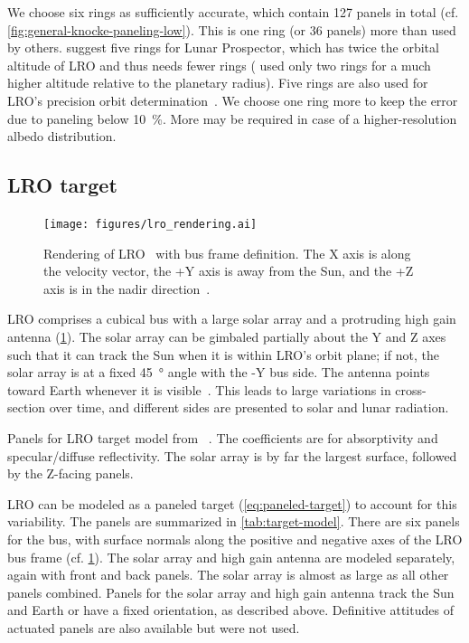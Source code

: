 We choose six rings as sufficiently accurate, which contain 127 panels in total (cf. \cref{fig:general-knocke-paneling-low}). This is one ring (or 36 panels) more than used by others. \citeauthor{Floberghagen1999} suggest five rings for Lunar Prospector, which has twice the orbital altitude of \gls{LRO} and thus needs fewer rings (\citeauthor{Knocke1988} used only two rings for a much higher altitude relative to the planetary radius). Five rings are also used for \gls{LRO}'s precision orbit determination~\cite{Nicholson2010}. We choose one ring more to keep the error due to paneling below \qty{10}{\percent}. More may be required in case of a higher-resolution albedo distribution.




\subsection{LRO target}
\label{subsec:lro-target}

\begin{figure}[t]
    \centering
    \texttt{[image: figures/lro\_rendering.ai]}
    \caption{Rendering of \gls{LRO}~\cite{NSMD2018} with bus frame definition. The X axis is along the velocity vector, the +Y axis is away from the Sun, and the +Z axis is in the nadir direction~\cite{Tooley2010}.}
    \label{fig:lro-rendering}
\end{figure}

\gls{LRO} comprises a cubical bus with a large solar array and a protruding high gain antenna (\cref{fig:lro-rendering}). The solar array can be gimbaled partially about the Y and Z axes such that it can track the Sun when it is within \gls{LRO}'s orbit plane; if not, the solar array is at a fixed \qty{45}{\degree} angle with the -Y bus side. The antenna points toward Earth whenever it is visible~\cite{Mazarico2018}. This leads to large variations in cross-section over time, and different sides are presented to solar and lunar radiation.


\begin{table}[b]
    \centering
    \caption{Panels for \gls{LRO} target model from \citeauthor{Smith2008}~\cite{Smith2008}. The coefficients are for absorptivity and specular/diffuse reflectivity. The solar array is by far the largest surface, followed by the Z-facing panels.}
    \label{tab:target-model}
    
\end{table}

\gls{LRO} can be modeled as a paneled target (\cref{eq:paneled-target}) to account for this variability. The panels are summarized in \cref{tab:target-model}. There are six panels for the bus, with surface normals along the positive and negative axes of the \gls{LRO} bus frame (cf. \cref{fig:lro-rendering}). The solar array and high gain antenna are modeled separately, again with front and back panels. The solar array is almost as large as all other panels combined. Panels for the solar array and high gain antenna track the Sun and Earth or have a fixed orientation, as described above. Definitive attitudes of actuated panels are also available but were not used.

